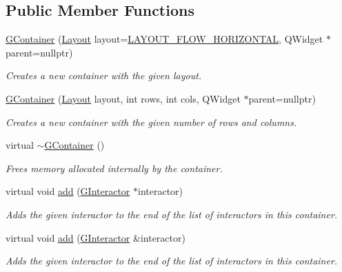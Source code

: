 \subsection*{Public Member Functions}
\begin{DoxyCompactItemize}
\item 
\mbox{\hyperlink{classGContainer_a09fc5a49b2ea0bc895fbf2772c311325}{G\+Container}} (\mbox{\hyperlink{classGContainer_a1b7da28ed84c0763e8f92cde2df4799b}{Layout}} layout=\mbox{\hyperlink{classGContainer_a1b7da28ed84c0763e8f92cde2df4799bac89a811e02b929a18f7f34e7d3bebd63}{L\+A\+Y\+O\+U\+T\+\_\+\+F\+L\+O\+W\+\_\+\+H\+O\+R\+I\+Z\+O\+N\+T\+AL}}, Q\+Widget $\ast$parent=nullptr)
\begin{DoxyCompactList}\small\item\em Creates a new container with the given layout. \end{DoxyCompactList}\item 
\mbox{\hyperlink{classGContainer_a042cb94e18801664efa748e8a8fa74c1}{G\+Container}} (\mbox{\hyperlink{classGContainer_a1b7da28ed84c0763e8f92cde2df4799b}{Layout}} layout, int rows, int cols, Q\+Widget $\ast$parent=nullptr)
\begin{DoxyCompactList}\small\item\em Creates a new container with the given number of rows and columns. \end{DoxyCompactList}\item 
virtual \mbox{\hyperlink{classGContainer_aa7f04c9e10de9145c56d123473ba013d}{$\sim$\+G\+Container}} ()
\begin{DoxyCompactList}\small\item\em Frees memory allocated internally by the container. \end{DoxyCompactList}\item 
virtual void \mbox{\hyperlink{classGContainer_a6f99b7c841256dbdc5acaafbbca4e685}{add}} (\mbox{\hyperlink{classGInteractor}{G\+Interactor}} $\ast$interactor)
\begin{DoxyCompactList}\small\item\em Adds the given interactor to the end of the list of interactors in this container. \end{DoxyCompactList}\item 
virtual void \mbox{\hyperlink{classGContainer_a33b08fe5428ed634a658deab076099f7}{add}} (\mbox{\hyperlink{classGInteractor}{G\+Interactor}} \&interactor)
\begin{DoxyCompactList}\small\item\em Adds the given interactor to the end of the list of interactors in this container. \end{DoxyCompactList}\item 

\end{DoxyCompactItemize}
